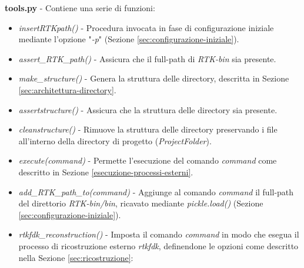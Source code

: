 \documentclass[a4paper,12pt, doubleside]{report}
\begin{document}
            \bigskip
            \par
                \textbf{tools.py} - Contiene una serie di funzioni:
                
                \begin{itemize}
                        
                    \item \textit{insert\textunderscore RTK\textunderscore path()} - Procedura invocata in fase di configurazione iniziale mediante l'opzione "\textit{-p}" (Sezione \ref{sec:configurazione-iniziale}).
                        
                    \item \textit{assert\_RTK\_path()} - Assicura che il full-path di \textit{RTK-bin} sia presente.
                        
                    \item \textit{make\_structure()} - Genera la struttura delle directory, descritta in Sezione \ref{sec:architettura-directory}.
                        
                    \item \textit{assert\textunderscore structure()} - Assicura che la struttura delle directory sia presente.
                        
                    \item \textit{clean\textunderscore structure()} - Rimuove la struttura delle directory preservando i file all'interno della directory di progetto (\textit{ProjectFolder}).
                        
                    \item \textit{execute(command)} - Permette l'esecuzione del comando \textit{command} come descritto in Sezione \ref{esecuzione-processi-esterni}.
                        
                    \item \textit{add\_RTK\_path\_to(command)} - Aggiunge al comando \textit{command} il full-path del direttorio \textit{RTK-bin/bin}, ricavato mediante \textit{pickle.load()} (Sezione \ref{sec:configurazione-iniziale}).
                        
                    \item \textit{rtkfdk\_reconstruction()} - Imposta il comando \textit{command} in modo che esegua il processo di ricostruzione esterno \textit{rtkfdk}, definendone le opzioni come descritto nella Sezione \ref{sec:ricostruzione}:
                        

\end{itemize}
\end{document}
